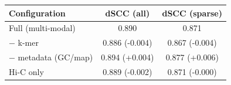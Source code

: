\renewcommand{\arraystretch}{1.2}
\begin{tabular}{@{}lcc@{}}
\toprule
\textbf{Configuration} & \textbf{dSCC (all)} & \textbf{dSCC (sparse)} \\
\midrule
Full (multi-modal) & 0.890 & 0.871 \\
$-$ k-mer & 0.886 (-0.004) & 0.867 (-0.004) \\
$-$ metadata (GC/map) & 0.894 (+0.004) & 0.877 (+0.006) \\
Hi-C only & 0.889 (-0.002) & 0.871 (-0.000) \\
\bottomrule
\end{tabular}
